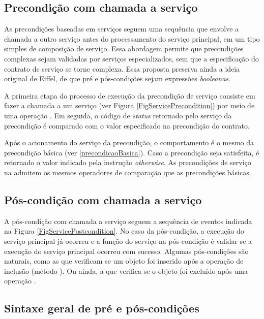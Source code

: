 \subsection{Precondição com chamada a serviço}

As precondições baseadas em serviços seguem uma sequência que envolve a chamada
a outro serviço antes do processamento do serviço principal, em um tipo simples de
composição de serviço. Essa abordagem permite que precondições complexas sejam
validadas por serviços especializados, sem que a especificação do contrato
de serviço se torne complexa. Essa proposta preserva ainda a ideia original de
Eiffel\cite{meyer1988eiffel}, de que pré e pós-condições sejam expressões
\emph{booleanas}.

A primeira etapa do processo de execução da precondição de serviço consiste em
fazer a chamada a um serviço (ver Figura \ref{FigServicePrecondition}) por meio de uma
operação . Em seguida, o código de \textit{status} retornado pelo
serviço da precondição é comparado com o valor especificado na precondição do contrato.

Após o acionamento do serviço da precondição, o comportamento é o mesmo da
precondição básica (ver \ref{precondicaoBasica}). Caso a precondição seja
satisfeita, é retornado o valor indicado pela instrução \emph{otherwise}. As
precondições de serviço na \neoidl{} admitem os mesmos operadores de comparação
que as precondições básicas.

\subsection{Pós-condição com chamada a serviço}
\label{Pos-condicao servico}

A pós-condição com chamada a serviço seguem a sequência de eventos indicada na
Figura \ref{FigServicePostcondition}. No caso da pós-condição, a execução do
serviço principal já ocorreu e a função do serviço na pós-condição é validar se
a execução do serviço principal ocorreu com sucesso. Algumas pós-condições são
naturais, como as que verificam se um objeto foi inserido após a operação de
inclusão (método ). Ou ainda, a que verifica se o objeto foi excluído
após uma operação .

\subsection{Sintaxe geral de pré e pós-condições}
\label{SintaxeGeralDbc}

